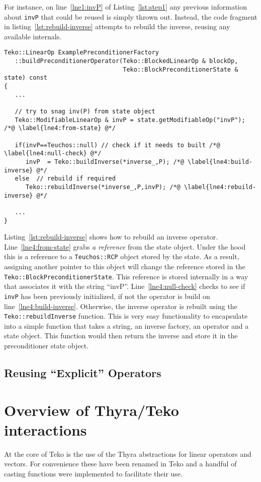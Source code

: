 \documentclass[12pt]{article}
\newcommand{\code}[1]{\lstinline[basicstyle=\footnotesize]!#1!}
\begin{document}
For instance, on line~\ref{lne1:invP} of Listing~\ref{lst:step1} any previous information 
about \code{invP} that could be reused is simply thrown out. Instead, the code fragment
in listing~\ref{lst:rebuild-inverse} attempts to rebuild the inverse, reusing any available internals.
\begin{framed}
\begin{lstlisting}[caption=\footnotesize ``Rebuilding an inverse'', label=lst:rebuild-inverse]
Teko::LinearOp ExamplePreconditionerFactory
   ::buildPreconditionerOperator(Teko::BlockedLinearOp & blockOp,
                                 Teko::BlockPreconditionerState & state) const
{
   ...

   // try to snag inv(P) from state object
   Teko::ModifiableLinearOp & invP = state.getModifiableOp("invP"); /*@ \label{lne4:from-state} @*/
   
   if(invP==Teuchos::null) // check if it needs to built /*@ \label{lne4:null-check} @*/
      invP  = Teko::buildInverse(*inverse_,P); /*@ \label{lne4:build-inverse} @*/
   else  // rebuild if required
      Teko::rebuildInverse(*inverse_,P,invP); /*@ \label{lne4:rebuild-inverse} @*/
   
   ...
}
\end{lstlisting}
\end{framed}
Listing~\ref{lst:rebuild-inverse} shows how to rebuild an inverse operator. Line~\ref{lne4:from-state}
grabs \emph{a reference} from the state object. Under the hood this is a reference to a
\code{Teuchos::RCP} object stored by the state. As a result, assigning another pointer to this
object will change the reference stored in the \code{Teko::BlockPreconditionerState}. This reference
is stored internally in a way that associates it with the string ``invP''. Line~\ref{lne4:null-check}
checks to see if \code{invP} has been previously initialized, if not the operator is build on
line~\ref{lne4:build-inverse}. Otherwise, the inverse operator is rebuilt using the
\code{Teko::rebuildInverse} function. This is very easy functionality to encapsulate into
a simple function that takes a string, an inverse factory, an operator and a state object. This
function would then return the inverse and store it in the preconditioner state object.

\subsection{Reusing ``Explicit'' Operators}

\section{Overview of Thyra/Teko interactions}\label{sec:thyra-pb}
At the core of Teko is the use of the Thyra abstractions for linear operators
and vectors. For convenience these have been renamed in Teko and a handful of casting
functions were implemented to facilitate their use. 
\end{document}
